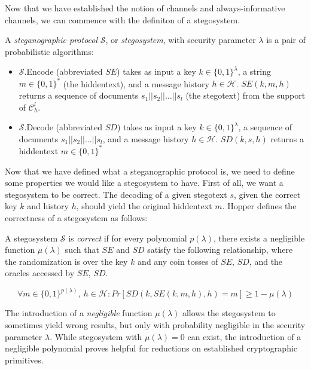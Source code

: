 Now that we have established the notion of channels and always-informative channels, we can commence with the definiton of a stegosystem.

\begin{definition}
\label{def:stegosystem}
A \emph{steganographic protocol} $\mathcal{S}$, or \emph{stegosystem}, with security parameter $\lambda$ is a pair of probabilistic algorithms:

\begin{itemize}
	\item $\mathcal{S}$.Encode (abbreviated $SE$) takes as input a key $k \in \{0,1\}^\lambda$, a string $m \in \{0,1\}^*$ (the hiddentext), and a message history $h \in \mathcal{H}$.
		$SE(k, m, h)$ returns a sequence of documents $s_1||s_2||\dots||s_l$ (the stegotext) from the support of $\mathcal{C}_h^l$.
	\item $\mathcal{S}$.Decode (abbreviated $SD$) takes as input a key $k \in \{0,1\}^\lambda$, a sequence of documents $s_1||s_2||\dots||s_l$, and a message history $h \in \mathcal{H}$.
		$SD(k, s, h)$ returns a hiddentext $m \in \{0,1\}^*$
\end{itemize}
\end{definition}

Now that we have defined what a steganographic protocol is, we need to define some properties we would like a stegosystem to have.
First of all, we want a stegosystem to be correct.
The decoding of a given stegotext $s$, given the correct key $k$ and history $h$, should yield the original hiddentext $m$.
Hopper defines the correctness of a stegosystem as follows:

\begin{definition}
\label{def:correctness-hopper}
A stegosystem $\mathcal{S}$ is \emph{correct} if for every polynomial $p(\lambda)$, there exists a negligible function $\mu(\lambda)$ such that $SE$ and $SD$ satisfy the following relationship, where the randomization is over the key $k$ and any coin tosses of $SE$, $SD$, and the oracles accessed by $SE$, $SD$.

$$\forall m \in \{0,1\}^{p(\lambda)},~ h \in \mathcal{H} \colon Pr[SD(k, SE(k, m, h), h) = m] \geq 1 - \mu(\lambda)$$

\end{definition}

The introduction of a \emph{negligible} function $\mu(\lambda)$ allows the stegosystem to sometimes yield wrong results, but only with probability negligible in the security parameter $\lambda$.
While stegosystem with $\mu(\lambda) = 0$ can exist, the introduction of a negligible polynomial proves helpful for reductions on established cryptographic primitives.

